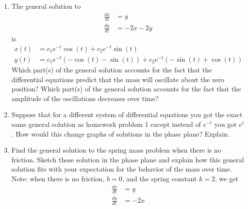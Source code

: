 \begin{enumerate}
\item	The general solution to \label{11HWproblem1}
\begin{align*}
\frac{dx}{dt}&=y\\
\frac{dy}{dt}&= -2x-2y
\end{align*}
is
\begin{align*}
x(t) &= c_1e^{-t}\cos(t)+c_2e^{-t}\sin(t) \\
y(t) &= c_1e^{-t}(-\cos(t)-\sin(t))+c_2e^{-t}(-\sin(t)+\cos(t))
\end{align*}
Which part(s) of the general solution accounts for the fact that the differential equations predict that the mass will oscillate about the zero position? Which part(s) of the general solution accounts for the fact that the amplitude of the oscillations decreases over time?

\item	Suppose that for a different system of differential equations you got the exact same general solution as homework problem 1 except instead of $e^{-t}$ you got $e^t$. How would this change graphs of solutions in the phase plane? Explain. \label{11HWproblem2} 

\item	Find the general solution to the spring mass problem when there is no friction. Sketch these solution in the phase plane and explain how this general solution fits with your expectation for the behavior of the mass over time. Note: when there is no friction, $b = 0$, and the spring constant $k = 2$, we get \label{11HWproblem3}    
\begin{align*}
\frac{dx}{dt}&=y\\ \frac{dy}{dt}&= -2x
\end{align*}

\clearpage


\end{enumerate}
